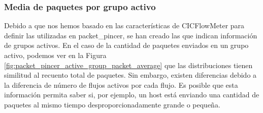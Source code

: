 \subsubsection{Media de paquetes por grupo activo}

Debido a que nos hemos basado en las características de CICFlowMeter para definir las utilizadas en packet\_pincer, se han creado las que indican información de grupos activos. En el caso de la cantidad de paquetes enviados en un grupo activo, podemos ver en la Figura \ref{fig:packet_pincer_active_group_packet_average} que las distribuciones tienen similitud al recuento total de paquetes. Sin embargo, existen diferencias debido a la diferencia de número de flujos activos por cada flujo. Es posible que esta información permita saber si, por ejemplo, un host está enviando una cantidad de paquetes al mismo tiempo desproporcionadamente grande o pequeña.

